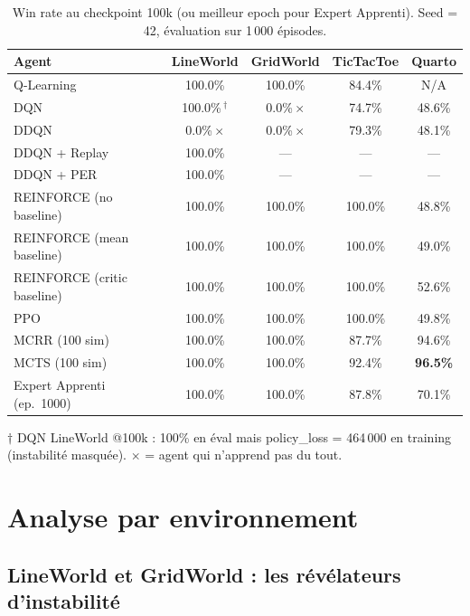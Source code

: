 \documentclass[12pt,a4paper]{article}
\begin{document}
\begin{table}[H]
\centering
\caption{Win rate au checkpoint 100k (ou meilleur epoch pour Expert Apprenti). Seed = 42, évaluation sur 1\,000 épisodes.}
\begin{tabular}{lcccc}
\toprule
\textbf{Agent} & \textbf{LineWorld} & \textbf{GridWorld} & \textbf{TicTacToe} & \textbf{Quarto} \\
\midrule
Q-Learning & 100.0\% & 100.0\% & 84.4\% & N/A \\
DQN & 100.0\%\,$^\dagger$ & 0.0\%\,{\color{red}$\times$} & 74.7\% & 48.6\% \\
DDQN & 0.0\%\,{\color{red}$\times$} & 0.0\%\,{\color{red}$\times$} & 79.3\% & 48.1\% \\
DDQN + Replay & 100.0\% & — & — & — \\
DDQN + PER & 100.0\% & — & — & — \\
\midrule
REINFORCE (no baseline) & 100.0\% & 100.0\% & 100.0\% & 48.8\% \\
REINFORCE (mean baseline) & 100.0\% & 100.0\% & 100.0\% & 49.0\% \\
REINFORCE (critic baseline) & 100.0\% & 100.0\% & 100.0\% & 52.6\% \\
PPO & 100.0\% & 100.0\% & 100.0\% & 49.8\% \\
\midrule
MCRR (100 sim) & 100.0\% & 100.0\% & 87.7\% & 94.6\% \\
MCTS (100 sim) & 100.0\% & 100.0\% & 92.4\% & \textbf{96.5\%} \\
\midrule
Expert Apprenti (ep.\ 1000) & 100.0\% & 100.0\% & 87.8\% & 70.1\% \\
\bottomrule
\end{tabular}

\smallskip
\footnotesize{$\dagger$ DQN LineWorld @100k : 100\% en éval mais policy\_loss = 464\,000 en training (instabilité masquée). {\color{red}$\times$} = agent qui n'apprend pas du tout.}
\label{tab:winrates}
\end{table}

\section{Analyse par environnement}

\subsection{LineWorld et GridWorld : les révélateurs d'instabilité}
\end{document}
